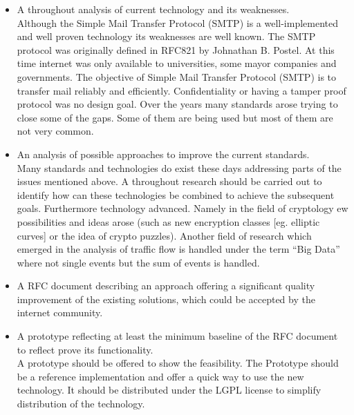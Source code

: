 \begin{itemize}
  \item A throughout analysis of current technology and its weaknesses.\\
	      Although the Simple Mail Transfer Protocol (SMTP) is a well-implemented and well proven technology its weaknesses are well known. The SMTP protocol was originally defined in RFC821\cite{RFC821} by Johnathan B. Postel. At this time internet was only available to universities, some mayor companies and governments. The objective of Simple Mail Transfer Protocol (SMTP) is to transfer mail reliably and efficiently\cite[p.~1]{RFC821}. Confidentiality or having a tamper proof protocol was no design goal. Over the years many standards arose trying to close some of the gaps. Some of them are being used but most of them are not very common. 
	\item An analysis of possible approaches to improve the current standards.\\
	      Many standards and technologies do exist these days addressing parts of the issues mentioned above. A throughout research should be carried out to identify how can these technologies be combined to achieve the subsequent goals. Furthermore technology advanced. Namely in the field of cryptology ew possibilities and ideas arose (such as new encryption classes [eg. elliptic curves] or the idea of crypto puzzles). Another field of research which emerged in the analysis of traffic flow is handled under the term ``Big Data'' where not single events but the sum of events is handled.
	\item A RFC document describing an approach offering a significant quality improvement of the existing solutions, which could be accepted by the internet community.
	\item A prototype reflecting at least the minimum baseline of the RFC document to reflect prove its functionality.\\
	      A prototype should be offered to show the feasibility. The Prototype should be a reference implementation and offer a quick way to use the new technology. It should be distributed under the LGPL license to simplify distribution of the technology. 
\end{itemize}

